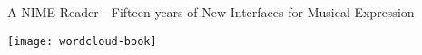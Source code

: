 %
%
%

\begin{dedication}
A NIME Reader---Fifteen years of New Interfaces for Musical Expression
\end{dedication}



\begin{figure*}[t]
\centering
\texttt{[image: wordcloud-book]}
\caption{}
\end{figure*}
